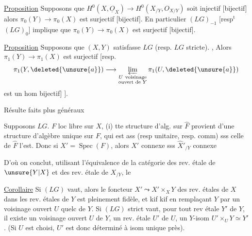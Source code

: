 \uline{Proposition} Supposons que $H^0(X,\underline{O}_X)\longrightarrow H^0(X_{/Y},O_{X/Y})$ soit injectif [bijectif] alors $\pi_0(Y)\longrightarrow\pi_0(X)$ est surjectif [bijectif]. En particulier $(LG)_{-1}$ [resp$^{\mathrm{t}}$ $(LG)_0$] implique que $\pi_0(Y)\longrightarrow\pi_0(X)$ est surjectif [bijectif].

\uline{Proposition}  Supposons que $(X,Y)$ satisfasse  $LG$ (resp. $LG$ stricte). , Alors $\pi_1(Y)\longrightarrow\pi_1(X)$ est surjectif [resp.
\[
\pi_1(Y,\deleted{\unsure{a}})\longrightarrow
\varprojlim_{\substack{U\ \text{voisinage}\\\text{ouvert de }Y}}\pi_1(U,\deleted{\unsure{a}})
\]
est un hom \deleted{surjectif [resp.} bijectif] ].

Résulte  faits plus généraux

\uline{} Supposons $LG$.   $F$ loc libre sur $X$, (i) tte structure d'alg.   sur $\hat F$ provient d'une structure d'algèbre unique sur $F$, qui est ass (resp unitaire, resp. comm) sss celle de $\hat F$ l'est.  Donc si $X'=\operatorname{Spec}(F)$, alors $X'$ connexe sss $\hat X'_{/Y}$ connexe


D'où on conclut, utilisant l'équivalence de la catégorie des rev. étale de $\unsure{Y|X}$ et des rev. étale de $X_{/Y}$, le

\uline{Corollaire} Si $(LG)$ vaut, alors le foncteur $X'\leadsto X'\times_X Y$ des rev. étales de $X$ dans les rev. étales de $Y$ est pleinement fidèle,  et kif kif en remplaçant $Y$ par un voisinage ouvert $U$ quelc de $Y$. Si $(LG)$ strict vaut,  pour tout rev étale $Y'$ de $Y$, il existe un  voisinage ouvert $U$ de $Y$,  un rev. étale $U'$ de $U$,   un $Y$-isom $U'\times_U Y\simeq Y'$. (Si $U$ est choisi, $U'$ est donc déterminé à isom unique près).


